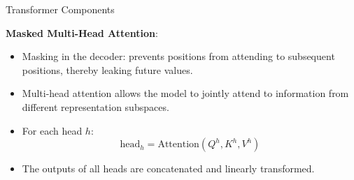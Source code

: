 \begin{vbframe}{Transformer Components}
  \framebreak

\textbf{Masked Multi-Head Attention}:
  \begin{itemize}
    \item Masking in the decoder: prevents positions from attending to subsequent positions, thereby leaking future values.
    \item Multi-head attention allows the model to jointly attend to information from different representation subspaces.
    \item For each head \( h \):
        \[
        \text{head}_h = \text{Attention}(Q^h, K^h, V^h)
        \]
    \item The outputs of all heads are concatenated and linearly transformed.
  \end{itemize}
  
\end{vbframe}







%
%

